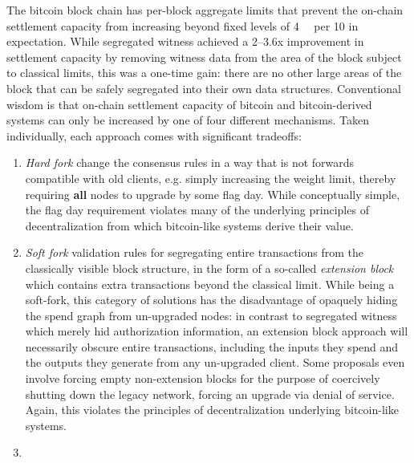 The bitcoin block chain has per-block aggregate limits that prevent
the on-chain settlement capacity from increasing beyond fixed levels
of \SI{4}{\mega\weight} per \SI{10}{\min} in expectation.  While
segregated witness achieved a \numrange{2}{3.6}x improvement in
settlement capacity by removing witness data from the area of the
block subject to classical limits, this was a one-time gain: there are
no other large areas of the block that can be safely segregated into
their own data structures.  Conventional wisdom is that on-chain
settlement capacity of bitcoin and bitcoin-derived systems can only be
increased by one of four different mechanisms.  Taken individually,
each approach comes with significant tradeoffs:

\begin{enumerate}

  \item

    \emph{Hard fork} change the consensus rules in a way that is not
    forwards compatible with old clients, e.g. simply increasing the
    weight limit, thereby requiring \textbf{all} nodes to upgrade by
    some flag day.  While conceptually simple, the flag day
    requirement violates many of the underlying principles of
    decentralization from which bitcoin-like systems derive their
    value.

  \item

    \emph{Soft fork} validation rules for segregating entire
    transactions from the classically visible block structure, in the
    form of a so-called \emph{extension block} which contains extra
    transactions beyond the classical limit.  While being a soft-fork,
    this category of solutions has the disadvantage of opaquely hiding
    the spend graph from un-upgraded nodes: in contrast to segregated
    witness which merely hid authorization information, an extension
    block approach will necessarily obscure entire transactions,
    including the inputs they spend and the outputs they generate from
    any un-upgraded client.  Some proposals even involve forcing empty
    non-extension blocks for the purpose of coercively shutting down
    the legacy network, forcing an upgrade via denial of service.
    Again, this violates the principles of decentralization underlying
    bitcoin-like systems.

  \item


\end{enumerate}
